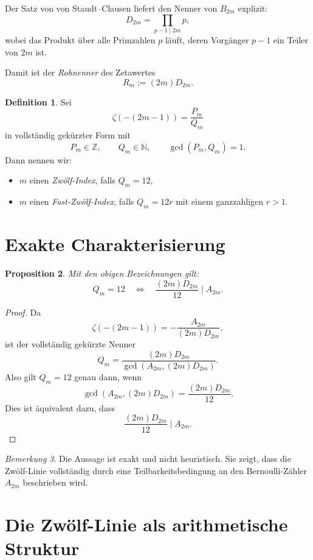 \documentclass[11pt,a4paper]{article}
\theoremstyle{definition}
\newtheorem{definition}{Definition}[section]
\theoremstyle{plain}
\newtheorem{proposition}[definition]{Proposition}
\theoremstyle{remark}
\newtheorem{bemerkung}[definition]{Bemerkung}
\begin{document}
	Der Satz von von Staudt--Clausen liefert den Nenner von $B_{2m}$ explizit:
	\[
	D_{2m}=\prod_{p-1\mid 2m} p,
	\]
	wobei das Produkt über alle Primzahlen $p$ läuft, deren Vorgänger $p-1$ ein Teiler von $2m$ ist.
	
	Damit ist der \emph{Rohnenner} des Zetawertes
	\[
	R_m:=(2m)D_{2m}.
	\]
	
	\begin{definition}
		Sei
		\[
		\zeta(-(2m-1))=\frac{P_m}{Q_m}
		\]
		in vollständig gekürzter Form mit
		\[
		P_m\in\mathbb{Z},\qquad Q_m\in\mathbb{N},\qquad \gcd(P_m,Q_m)=1.
		\]
		Dann nennen wir:
		\begin{itemize}
			\item $m$ einen \emph{Zwölf-Index}, falls $Q_m=12$,
			\item $m$ einen \emph{Fast-Zwölf-Index}, falls $Q_m=12r$ mit einem ganzzahligen $r>1$.
		\end{itemize}
	\end{definition}
	
	\section{Exakte Charakterisierung}
	
	\begin{proposition}
		Mit den obigen Bezeichnungen gilt:
		\[
		Q_m=12
		\quad\Longleftrightarrow\quad
		\frac{(2m)D_{2m}}{12}\mid A_{2m}.
		\]
	\end{proposition}
	
	\begin{proof}
		Da
		\[
		\zeta(-(2m-1))=-\frac{A_{2m}}{(2m)D_{2m}},
		\]
		ist der vollständig gekürzte Nenner
		\[
		Q_m=\frac{(2m)D_{2m}}{\gcd(A_{2m},(2m)D_{2m})}.
		\]
		Also gilt $Q_m=12$ genau dann, wenn
		\[
		\gcd(A_{2m},(2m)D_{2m})=\frac{(2m)D_{2m}}{12}.
		\]
		Dies ist äquivalent dazu, dass
		\[
		\frac{(2m)D_{2m}}{12}\mid A_{2m}.
		\]
	\end{proof}
	
	\begin{bemerkung}
		Die Aussage ist exakt und nicht heuristisch. Sie zeigt, dass die Zwölf-Linie vollständig durch eine Teilbarkeitsbedingung an den Bernoulli-Zähler $A_{2m}$ beschrieben wird.
	\end{bemerkung}
	
	\section{Die Zwölf-Linie als arithmetische Struktur}
	
\end{document}

